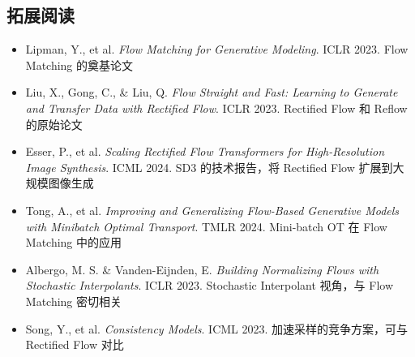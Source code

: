 \documentclass[a4paper]{article}
\begin{document}
\subsection{拓展阅读}

\begin{itemize}
    \item Lipman, Y., et al. \textit{Flow Matching for Generative Modeling}. ICLR 2023. {\small Flow Matching 的奠基论文}
    \item Liu, X., Gong, C., \& Liu, Q. \textit{Flow Straight and Fast: Learning to Generate and Transfer Data with Rectified Flow}. ICLR 2023. {\small Rectified Flow 和 Reflow 的原始论文}
    \item Esser, P., et al. \textit{Scaling Rectified Flow Transformers for High-Resolution Image Synthesis}. ICML 2024. {\small SD3 的技术报告，将 Rectified Flow 扩展到大规模图像生成}
    \item Tong, A., et al. \textit{Improving and Generalizing Flow-Based Generative Models with Minibatch Optimal Transport}. TMLR 2024. {\small Mini-batch OT 在 Flow Matching 中的应用}
    \item Albergo, M. S. \& Vanden-Eijnden, E. \textit{Building Normalizing Flows with Stochastic Interpolants}. ICLR 2023. {\small Stochastic Interpolant 视角，与 Flow Matching 密切相关}
    \item Song, Y., et al. \textit{Consistency Models}. ICML 2023. {\small 加速采样的竞争方案，可与 Rectified Flow 对比}
\end{itemize}

\end{document}
